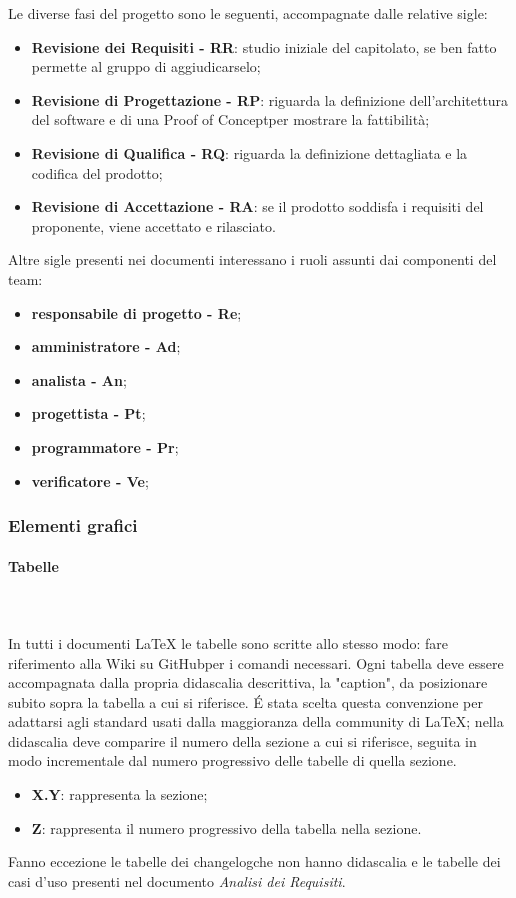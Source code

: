 		Le diverse fasi del progetto sono le seguenti, accompagnate dalle relative sigle:
		\begin{itemize}
			\item \textbf{Revisione dei Requisiti - RR}: studio iniziale del capitolato\glo, se ben fatto permette al gruppo di aggiudicarselo;
			\item \textbf{Revisione di Progettazione - RP}: riguarda la definizione dell'architettura del software e di una Proof of Concept\glosp per mostrare la fattibilità;
			\item \textbf{Revisione di Qualifica - RQ}: riguarda la definizione dettagliata e la codifica del prodotto;
			\item \textbf{Revisione di Accettazione - RA}: se il prodotto soddisfa i requisiti del proponente, viene accettato e rilasciato.		
		\end{itemize}	
		Altre sigle presenti nei documenti interessano i ruoli assunti dai componenti del team:
		\begin{itemize}
			\item \textbf{responsabile di progetto - Re};
			\item \textbf{amministratore - Ad};
			\item \textbf{analista - An};
			\item \textbf{progettista - Pt};
			\item \textbf{programmatore - Pr};
			\item \textbf{verificatore - Ve};
		\end{itemize}
		\subsubsection{Elementi grafici}
		\paragraph{Tabelle} \mbox{}\\ \mbox{}\\
		In tutti i documenti \LaTeX{} le tabelle sono scritte allo stesso modo: fare riferimento alla Wiki su GitHub\glosp per i comandi necessari.\newline 
		Ogni tabella deve essere accompagnata dalla propria didascalia descrittiva, la "caption", da posizionare subito sopra la tabella a cui si riferisce. \'E stata scelta questa convenzione per adattarsi agli standard usati dalla maggioranza della community di \LaTeX{}; nella didascalia deve comparire il numero della sezione a cui si riferisce, seguita in modo incrementale dal numero progressivo delle tabelle di quella sezione.
		\begin{itemize}
			\item \textbf{{X.Y}}: rappresenta la sezione;
			\item \textbf{{Z}}: rappresenta il numero progressivo della tabella nella sezione.
		\end{itemize}
		Fanno eccezione le tabelle dei changelog\glosp che non hanno didascalia e le tabelle dei casi d'uso presenti nel documento \textit{Analisi dei Requisiti}.

